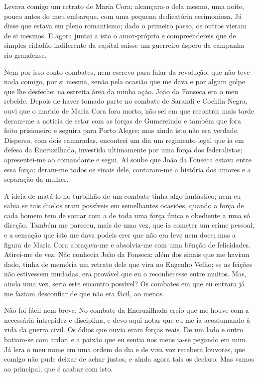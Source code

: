 Levava comigo um retrato de Maria Cora; alcançara-o dela mesmo, uma
noite, pouco antes do meu embarque, com uma pequena dedicatória
cerimoniosa. Já disse que estava em pleno romantismo; dado o primeiro
passo, os outros vieram de si mesmos. E agora juntai a isto o
amor-próprio e compreendereis que de simples cidadão indiferente da
capital saísse um guerreiro áspero da campanha rio-grandense.

Nem por isso conto combates, nem escrevo para falar da revolução, que
não teve nada comigo, por si mesma, senão pela ocasião que me dava e por
algum golpe que lhe desfechei na estreita área da minha ação. João da
Fonseca era o meu rebelde. Depois de haver tomado parte no combate de
Sarandi e Cochila Negra, ouvi que o marido de Maria Cora fora morto, não
sei em que recontro; mais tarde deram-me a notícia de estar com as
forças de Gumercindo e também que fora feito prisioneiro e seguira para
Porto Alegre; mas ainda isto não era verdade. Disperso, com dois
camaradas, encontrei um dia um regimento legal que ia em defesa da
Encruzilhada, investida ultimamente por uma força dos federalistas;
apresentei-me ao comandante e segui. Aí soube que João da Fonseca estava
entre essa força; deram-me todos os sinais dele, contaram-me a história
dos amores e a separação da mulher.

A ideia de matá-lo no turbilhão de um combate tinha algo fantástico; nem
eu sabia se tais duelos eram possíveis em semelhantes ocasiões, quando a
força de cada homem tem de somar com a de toda uma força única e
obediente a uma só direção. Também me pareceu, mais de uma vez, que ia
cometer um crime pessoal, e a sensação que isto me dava podeis crer que
não era leve nem doce; mas a figura de Maria Cora abraçava-me e
absolvia-me com uma bênção de felicidades. Atirei-me de vez. Não
conhecia João da Fonseca; além dos sinais que me haviam dado, tinha de
memória um retrato dele que vira no Engenho Velho; se as feições não
estivessem mudadas, era provável que eu o reconhecesse entre muitos.
Mas, ainda uma vez, seria este encontro possível? Os combates em que eu
entrara já me faziam desconfiar de que não era fácil, ao menos.

Não foi fácil nem breve. No combate da Encruzilhada creio que me houve
com a necessária intrepidez e disciplina, e devo aqui notar que eu me ia
acostumando à vida da guerra civil. Os ódios que ouvia eram forças
reais. De um lado e outro batiam-se com ardor, e a paixão que eu sentia
nos meus ia-se pegando em mim. Já lera o meu nome em uma ordem do dia e
de viva voz recebera louvores, que comigo não pude deixar de achar
justos, e ainda agora tais os declaro. Mas vamos ao principal, que é
acabar com isto.

